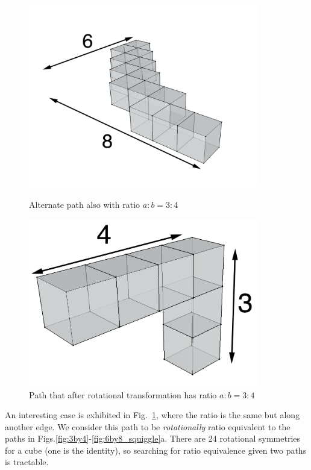 \begin{figure}
\begin{minipage}[t]{.45\textwidth}
  \includegraphics[width=0.9\textwidth]{./figures/6by8_squiggle}
    \caption{Alternate path also with ratio $a:b = 3:4$}
		\label{fig:6by8_squiggle}
  \end{minipage}
  \begin{minipage}[t]{.45\textwidth}
  \centering
  \includegraphics[width=0.9\textwidth]{./figures/3by4_upended.png}
  \caption{Path that after rotational transformation has ratio $a:b=3:4$} 
  \label{fig:3by4_upended}
  \end{minipage}\hfill
\end{figure}

    
An interesting case is exhibited in Fig.~\ref{fig:3by4_upended}, where the ratio is the same but along another edge.
We consider this path to be \emph{rotationally} ratio equivalent to the paths in Figs.\ref{fig:3by4}-\ref{fig:6by8_squiggle}a.
There are 24 rotational symmetries for a cube (one is the identity), so searching for ratio equivalence given two paths is tractable.

